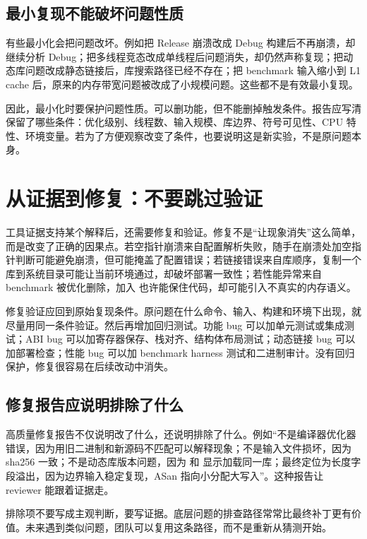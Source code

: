 \subsection{最小复现不能破坏问题性质}

有些最小化会把问题改坏。例如把 Release 崩溃改成 Debug 构建后不再崩溃，却继续分析 Debug；把多线程竞态改成单线程后问题消失，却仍然声称复现；把动态库问题改成静态链接后，库搜索路径已经不存在；把 benchmark 输入缩小到 L1 cache 后，原来的内存带宽问题被改成了小规模问题。这些都不是有效最小复现。

因此，最小化时要保护问题性质。可以删功能，但不能删掉触发条件。报告应写清保留了哪些条件：优化级别、线程数、输入规模、库边界、符号可见性、CPU 特性、环境变量。若为了方便观察改变了条件，也要说明这是新实验，不是原问题本身。

\section{从证据到修复：不要跳过验证}

工具证据支持某个解释后，还需要修复和验证。修复不是“让现象消失”这么简单，而是改变了正确的因果点。若空指针崩溃来自配置解析失败，随手在崩溃处加空指针判断可能避免崩溃，但可能掩盖了配置错误；若链接错误来自库顺序，复制一个库到系统目录可能让当前环境通过，却破坏部署一致性；若性能异常来自 benchmark 被优化删除，加入  也许能保住代码，却可能引入不真实的内存语义。

修复验证应回到原始复现条件。原问题在什么命令、输入、构建和环境下出现，就尽量用同一条件验证。然后再增加回归测试。功能 bug 可以加单元测试或集成测试；ABI bug 可以加寄存器保存、栈对齐、结构体布局测试；动态链接 bug 可以加部署检查；性能 bug 可以加 benchmark harness 测试和二进制审计。没有回归保护，修复很容易在后续改动中消失。

\subsection{修复报告应说明排除了什么}

高质量修复报告不仅说明改了什么，还说明排除了什么。例如“不是编译器优化器错误，因为用旧二进制和新源码不匹配可以解释现象；不是输入文件损坏，因为 sha256 一致；不是动态库版本问题，因为  和  显示加载同一库；最终定位为长度字段溢出，因为边界输入稳定复现，ASan 指向小分配大写入”。这种报告让 reviewer 能跟着证据走。

排除项不要写成主观判断，要写证据。底层问题的排查路径常常比最终补丁更有价值。未来遇到类似问题，团队可以复用这条路径，而不是重新从猜测开始。

